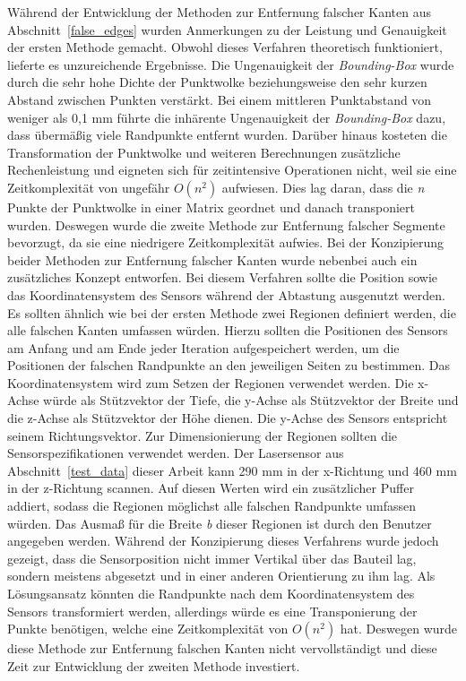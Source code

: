 Während der Entwicklung der Methoden zur Entfernung falscher Kanten aus Abschnitt~\ref{false_edges} wurden Anmerkungen zu der Leistung und Genauigkeit der ersten Methode gemacht. Obwohl dieses Verfahren theoretisch funktioniert, lieferte es unzureichende Ergebnisse. Die Ungenauigkeit der \textit{Bounding-Box} wurde durch die sehr hohe Dichte der Punktwolke beziehungsweise den sehr kurzen Abstand zwischen Punkten verstärkt. Bei einem mittleren Punktabstand von weniger als 0,1 mm führte die inhärente Ungenauigkeit der \textit{Bounding-Box} dazu, dass übermäßig viele Randpunkte entfernt wurden. Darüber hinaus kosteten die Transformation der Punktwolke und weiteren Berechnungen zusätzliche Rechenleistung und eigneten sich für zeitintensive Operationen nicht, weil sie eine Zeitkomplexität von ungefähr $O(n^2)$ aufwiesen. Dies lag daran, dass die \textit{n} Punkte der Punktwolke in einer Matrix geordnet und danach transponiert wurden. Deswegen wurde die zweite Methode zur Entfernung falscher Segmente bevorzugt, da sie eine niedrigere Zeitkomplexität aufwies. Bei der Konzipierung beider Methoden zur Entfernung falscher Kanten wurde nebenbei auch ein zusätzliches Konzept entworfen. Bei diesem Verfahren sollte die Position sowie das Koordinatensystem des Sensors während der Abtastung ausgenutzt werden. Es sollten ähnlich wie bei der ersten Methode zwei Regionen definiert werden, die alle falschen Kanten umfassen würden. Hierzu sollten die Positionen des Sensors am Anfang und am Ende jeder Iteration aufgespeichert werden, um die Positionen der falschen Randpunkte an den jeweiligen Seiten zu bestimmen. Das Koordinatensystem wird zum Setzen der Regionen verwendet werden. Die x-Achse würde als Stützvektor der Tiefe, die y-Achse als Stützvektor der Breite und die z-Achse als Stützvektor der Höhe dienen. Die y-Achse des Sensors entspricht seinem Richtungsvektor. Zur Dimensionierung der Regionen sollten die Sensorspezifikationen verwendet werden. Der Lasersensor aus Abschnitt~\ref{test_data} dieser Arbeit kann 290 mm in der x-Richtung und 460 mm in der z-Richtung scannen. Auf diesen Werten wird ein zusätzlicher Puffer addiert, sodass die Regionen möglichst alle falschen Randpunkte umfassen würden. Das Ausmaß für die Breite \textit{b} dieser Regionen ist durch den Benutzer angegeben werden. Während der Konzipierung dieses Verfahrens wurde jedoch gezeigt, dass die Sensorposition nicht immer Vertikal über das Bauteil lag, sondern meistens abgesetzt und in einer anderen Orientierung zu ihm lag. Als Lösungsansatz könnten die Randpunkte nach dem Koordinatensystem des Sensors transformiert werden, allerdings würde es eine Transponierung der Punkte benötigen, welche eine Zeitkomplexität von $O(n^2)$ hat. Deswegen wurde diese Methode zur Entfernung falschen Kanten nicht vervollständigt und diese Zeit zur Entwicklung der zweiten Methode investiert. 

